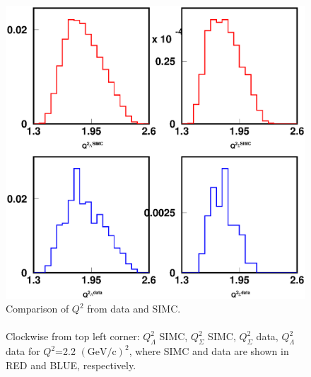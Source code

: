 \begin{figure}[!tbp]
  \centering
  \includegraphics[width=0.8\columnwidth]{Q2_1}
  \caption[Comparison of $Q^2$ from data and SIMC.]{\label{fig:Q2_1}Comparison of $Q^2$ from data and SIMC.\\\\ Clockwise from top left corner: $Q^2_\Lambda$ SIMC, $Q^2_\Sigma$ SIMC, $Q^2_\Sigma$ data, $Q^2_\Lambda$ data for $Q^2$=2.2 $(\mathrm{GeV/c})^2$, where SIMC and data are shown in RED and BLUE, respectively.}
\end{figure}

